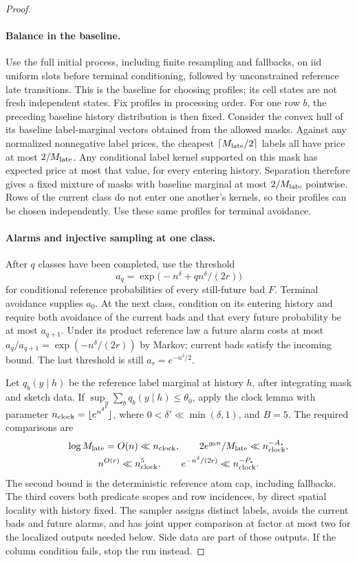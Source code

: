 \begin{proof}\leavevmode\par
\paragraph{Balance in the baseline.}
Use the full initial process, including finite resampling and fallbacks,
on iid uniform slots before terminal conditioning, followed by
unconstrained reference late transitions. This is the baseline for
choosing profiles; its cell states are not fresh independent states.
Fix profiles in processing order. For one row \(b\), the preceding
baseline history distribution is then fixed. Consider the convex hull
of its baseline label-marginal vectors obtained from the allowed masks.
Against any normalized nonnegative label prices, the cheapest
\(\lceil M_{\rm late}/2\rceil\) labels all have price at most
\(2/M_{\rm late}\). Any conditional label kernel supported on this
mask has expected price at most that value, for every entering history.
Separation therefore gives a fixed mixture of masks with baseline
marginal at most \(2/M_{\rm late}\) pointwise. Rows of the current
class do not enter one another's kernels, so their profiles can be
chosen independently. Use these same profiles for terminal avoidance.

\paragraph{Alarms and injective sampling at one class.}
After \(q\) classes have been completed, use the threshold
\[
 a_q=\exp\big(-n^\delta+q n^\delta/(2r)\big)
\]
for conditional reference probabilities of every still-future bad
\(F\). Terminal avoidance supplies \(a_0\). At the next class,
condition on its entering history and require both avoidance of the
current bads and that every future probability be at most \(a_{q+1}\).
Under its product reference law a future alarm costs at most
\(a_q/a_{q+1}=\exp(-n^\delta/(2r))\) by Markov; current bads
satisfy the incoming bound. The last threshold is still
\(a_r=e^{-n^\delta/2}\).

Let \(q_b(y\mid h)\) be the reference label marginal at history
\(h\), after integrating mask and sketch data. If
\(\sup_y\sum_bq_b(y\mid h)\le\theta_0\), apply the clock lemma
with parameter \(n_{\rm clock}=\lfloor e^{n^{\delta'}}\rfloor\),
where \(0<\delta'\ll\min(\delta,1)\), and \(B=5\).
The required comparisons are
\[
 \begin{gathered}
 \log M_{\rm late}=O(n)\ll n_{\rm clock},\qquad
 2e^{g_0n}/M_{\rm late}\ll n_{\rm clock}^{-A_*},\\
 n^{O(r)}\ll n_{\rm clock}^5,\qquad
 e^{-n^\delta/(2r)}\ll n_{\rm clock}^{-P_*}.
 \end{gathered}
\]
The second bound is the deterministic reference atom cap, including
fallbacks. The third covers both predicate scopes and row incidences,
by direct spatial locality with history fixed. The sampler assigns
distinct labels, avoids the current bads and future alarms, and has
joint upper comparison at factor at most two for the localized outputs
needed below. Side data are part of those outputs. If the column
condition fails, stop the run instead.


\end{proof}
